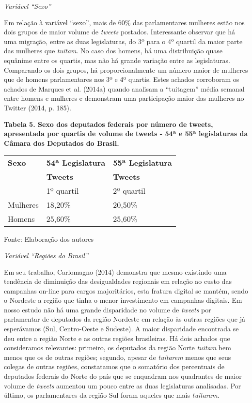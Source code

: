 \emph{Variável ``Sexo''}

Em relação à variável ``sexo'', mais de 60\% das parlamentares mulheres
estão nos dois grupos de maior volume de \emph{tweets} postados.
Interessante observar que há uma migração, entre as duas legislaturas,
do 3º para o 4º quartil da maior parte das mulheres que \emph{tuitam}.
No caso dos homens, há uma distribuição quase equânime entre os quartis,
mas não há grande variação entre as legislaturas. Comparando os dois
grupos, há proporcionalmente um número maior de mulheres que de homens
parlamentares nos 3º e 4º quartis. Estes achados corroboram os achados
de Marques et al. (2014a) quando analisam a ``tuitagem'' média semanal
entre homens e mulheres e demonstram uma participação maior das mulheres
no Twitter (2014, p. 185).

\textbf{Tabela 5. Sexo dos deputados federais por número de tweets,
apresentada por quartis de volume de tweets - 54ª e 55ª legislaturas da
Câmara dos Deputados do Brasil.}

\begin{longtable}[]{@{}lll@{}}
\toprule
\textbf{Sexo} & \textbf{54ª Legislatura} & \textbf{55ª
Legislatura}\tabularnewline
& \textbf{Tweets} & \textbf{Tweets}\tabularnewline
& 1º quartil & 2º quartil\tabularnewline
Mulheres & 18,20\% & 20,50\%\tabularnewline
Homens & 25,60\% & 25,60\%\tabularnewline
\bottomrule
\end{longtable}

Fonte: Elaboração dos autores

\emph{Variável ``Regiões do Brasil'' }

Em seu trabalho, Carlomagno (2014) demonstra que mesmo existindo uma
tendência de diminuição das desigualdades regionais em relação ao custo
das campanhas on-line para cargos majoritários, esta fratura digital se
mantém, sendo o Nordeste a região que tinha o menor investimento em
campanhas digitais. Em nosso estudo não há uma grande disparidade no
volume de \emph{tweets} por parlamentar de deputados da região Nordeste
em relação às outras regiões que já esperávamos (Sul, Centro-Oeste e
Sudeste). A maior disparidade encontrada se deu entre a região Norte e
as outras regiões brasileiras. Há dois achados que consideramos
relevantes: primeiro, os deputados da região Norte \emph{tuitam} bem
menos que os de outras regiões; segundo, apesar de \emph{tuitarem} menos
que seus colegas de outras regiões, constatamos que o somatório dos
percentuais de deputados federais do Norte do país que se enquadram nos
quadrantes de maior volume de \emph{tweets} aumentou um pouco entre as
duas legislaturas analisadas. Por último, os parlamentares da região Sul
foram aqueles que mais \emph{tuitaram}.

